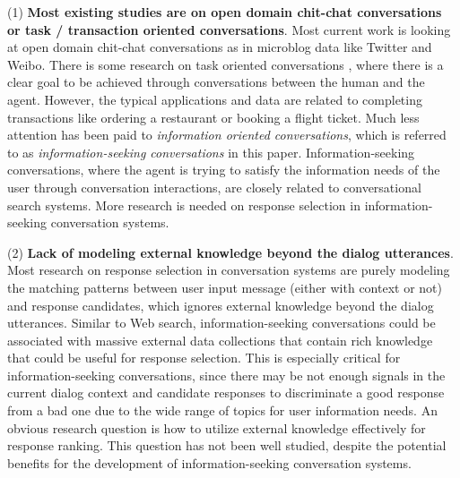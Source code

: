 (1) \textbf{Most existing studies are on open domain chit-chat conversations or task / transaction oriented conversations}. Most current work \cite{DBLP:conf/emnlp/RitterCD11,DBLP:conf/acl/ShangLL15, DBLP:journals/corr/JiLL14,DBLP:conf/sigir/YanSW16,DBLP:conf/cikm/YanSZW16,DBLP:conf/sigir/YanZE17} is looking at open domain chit-chat conversations as in microblog data like Twitter and Weibo. There is some research on task oriented conversations \cite{Young:2010:HIS:1621140.1621240,wen2016network,bordes2017learning}, where there is a clear goal to be achieved through conversations between the human and the agent. However, the typical applications and data are related to completing transactions like ordering a restaurant or booking a flight ticket. Much less attention has been paid to \textit{information oriented conversations}, which is referred to as \textit{information-seeking conversations} in this paper. Information-seeking conversations, where the agent is trying to satisfy the information needs of the user through conversation interactions, are closely related to conversational search systems. More research is needed on response selection in information-seeking conversation systems. 

(2) \textbf{Lack of modeling external knowledge beyond the dialog utterances}. Most research on response selection in conversation systems are purely modeling the matching patterns between user input message (either with context or not) and response candidates, which ignores external knowledge beyond the dialog utterances. Similar to Web search, information-seeking conversations could be associated with massive external data collections that contain rich knowledge that could be useful for response selection. This is especially critical for information-seeking conversations, since there may be not enough signals in the current dialog context and candidate responses to discriminate a good response from a bad one due to the wide range of topics for user information needs. An obvious research question is how to utilize external knowledge effectively for response ranking. This question has not been well studied, despite the potential benefits for the development of information-seeking conversation systems. 

